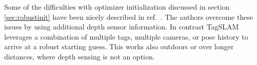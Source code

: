 Some of the difficulties with optimizer initialization discussed in
section \ref{sec:robustinit} have been nicely described in
ref.\ \cite{jin2017}. The authors overcome these issues by using
additional depth sensor information. In contrast TagSLAM leverages a
combination of multiple tags, multiple cameras, or pose history to
arrive at a robust starting guess. This works also outdoors or over
longer distances, where depth sensing is not an option.
